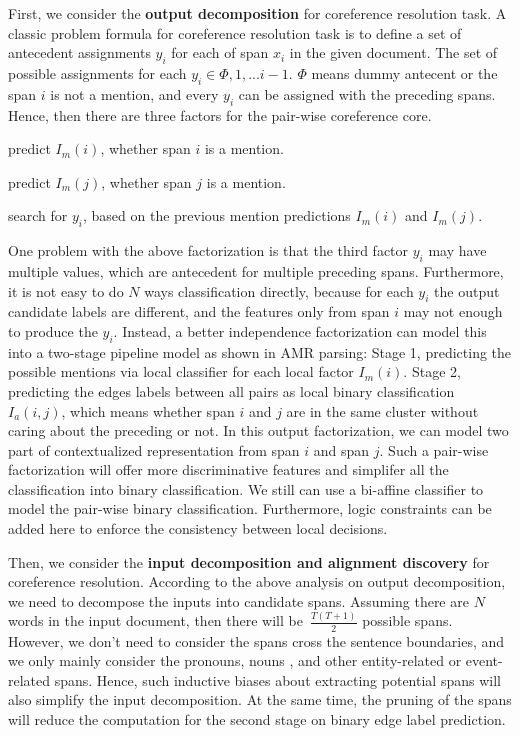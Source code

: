 First, we consider the \textbf{output decomposition} for coreference
resolution task.  A classic problem formula for coreference resolution
task is to define a set of antecedent assignments $y_{i}$ for each of
span $x_{i}$ in the given document. The set of possible assignments
for each $y_{i} \in {\Phi, 1,...i-1}$. $\Phi$ means dummy antecent or the span
$i$ is not a mention, and every $y_{i}$ can be assigned with the
preceding spans.  Hence, then there are three factors for the
pair-wise coreference core.
\begin{inparaenum}[(1)]
\item predict $I_{m}(i)$, whether span $i$ is a mention.
\item predict $I_{m}(j)$, whether span $j$ is a mention.
\item search for $y_{i}$, based on the previous mention predictions
  $I_{m}(i)$ and $I_{m}(j)$.
\end{inparaenum}
One problem with the above factorization is that the third factor
$y_{i}$ may have multiple values, which are antecedent for multiple
preceding spans. Furthermore, it is not easy to do $N$ ways
classification directly, because for each $y_{i}$ the output candidate
labels are different, and the features only from span $i$ may not
enough to produce the $y_{i}$. Instead, a better independence
factorization can model this into a two-stage pipeline model as shown
in AMR parsing: Stage 1, predicting the possible mentions via local
classifier for each local factor $I_{m}(i)$. Stage 2, predicting the
edges labels between all pairs as local binary classification
$I_{a}(i,j)$, which means whether span $i$ and $j$ are in the same
cluster without caring about the preceding or not. In this output
factorization, we can model two part of contextualized representation
from span $i$ and span $j$. Such a pair-wise factorization will offer
more discriminative features and simplifer all the classification into
binary classification.  We still can use a bi-affine classifier to
model the pair-wise binary classification. Furthermore, logic
constraints can be added here to enforce the consistency between local
decisions.

Then, we consider the \textbf{input decomposition and alignment
  discovery} for coreference resolution. According to the above
analysis on output decomposition, we need to decompose the inputs into
candidate spans. Assuming there are $N$ words in the input document,
then there will be~$\frac{T(T+1)}{2}$ possible spans. However, we
don't need to consider the spans cross the sentence boundaries, and we
only mainly consider the pronouns, nouns , and other entity-related or
event-related spans. Hence, such inductive biases about extracting
potential spans will also simplify the input decomposition. At the
same time, the pruning of the spans will reduce the computation for
the second stage on binary edge label prediction.

